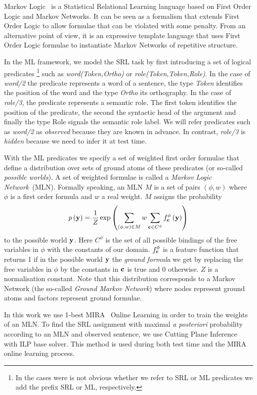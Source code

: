 Markov Logic~\citep[ML,][]{richardson05markov} is a Statistical Relational 
Learning language based on First Order Logic and Markov Networks. It can be seen 
as a formalism that extends First Order Logic to allow formulae that can be 
violated with some penalty. From an alternative point of view, it is an 
expressive template language that uses First Order Logic formulae to instantiate
Markov Networks of repetitive structure. 

In the ML framework,  we model the SRL task by first introducing a set of 
logical predicates \footnote{In the cases were is not obvious whether we refer 
to SRL or ML predicates we add the prefix SRL or ML, respectively.} such as 
\emph{word(Token,Ortho)} or \emph{role(Token,Token,Role)}. In the case of 
\emph{word/2} the predicate represents a word of a sentence, the type 
\emph{Token} identifies the position of the word and the type \emph{Ortho} its 
orthography. In the case of \emph{role/3}, the predicate represents a semantic 
role. The first token identifies the position of the predicate, the second the 
syntactic head of the argument and finally the type Role signals the semantic 
role label. We will refer predicates such as \emph{word/2} as \emph{observed} 
because they are known in advance. In contrast, \emph{role/3} is \emph{hidden} 
because we need to infer it at test time.

With the ML predicates we specify a set of weighted first order formulae that 
define a distribution over sets of ground atoms of these predicates (or 
so-called \emph{possible worlds}). A set of weighted formulae is called a 
\emph{Markov Logic Network}~(MLN). Formally speaking, an MLN $M$ is a set of 
pairs $\left(\phi,w\right)$ where $\phi$ is a first order formula and $w$ a real 
weight. $M$ assigns the probability
\begin{equation}
p\left(\mathbf{y}\right)=\frac{1}{Z}\exp\left(
\sum_{\left(\phi,w\right)\in M} w
\sum_{\mathbf{c}\in C^{\phi}}f_{\mathbf{c}}^{\phi}\left(\mathbf{y}\right)
\right)
\label{eq:prob}
\end{equation}
to the possible world $\mathbf{y}$.  Here $C^{\phi}$ is the set of all possible
bindings of the free variables in $\phi$ with the constants of our
domain. $f_{\mathbf{c}}^{\phi}$ is a feature function that returns 1
if in the possible world $\mathbf{y}$ the \emph{ground formula} we get by
replacing the free variables in $\phi$ by the constants in $\mathbf{c}$
is true and 0 otherwise. $Z$ is a normalisation constant. Note that
this distribution corresponds to a Markov Network (the so-called \emph{Ground
Markov Network}) where nodes represent ground atoms and factors represent
ground formulae.

In this work we use 1-best 
MIRA~\citep{crammer01ultraconservative} Online Learning in order to train the weights of an MLN.  To find the SRL assignment with maximal \emph{a posteriori} probability according to an MLN and observed sentence, we use Cutting Plane 
Inference~\citep[CPI,][]{riedel08improving} with ILP base solver. This method is 
used during both test time and the MIRA online learning process.

